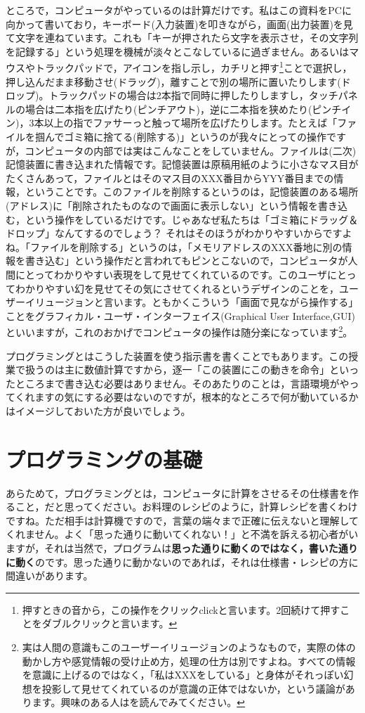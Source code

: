 \documentclass{ltjsbook}
\begin{document}
ところで，コンピュータがやっているのは計算だけです。私はこの資料をPCに向かって書いており，キーボード(入力装置)を叩きながら，画面(出力装置)を見て文字を連ねています。これも「キーが押されたら文字を表示させ，その文字列を記録する」という処理を機械が淡々とこなしているに過ぎません。あるいはマウスやトラックパッドで，アイコンを指し示し，カチリと押す\footnote{押すときの音から，この操作をクリックclickと言います。2回続けて押すことをダブルクリックと言います。}ことで選択し，押し込んだまま移動させ(ドラッグ)，離すことで別の場所に置いたりします(ドロップ)。トラックパッドの場合は2本指で同時に押したりしますし，タッチパネルの場合は二本指を広げたり(ピンチアウト)，逆に二本指を狭めたり(ピンチイン)，3本以上の指でファサーっと触って場所を広げたりします。たとえば「ファイルを掴んでゴミ箱に捨てる(削除する)」というのが我々にとっての操作ですが，コンピュータの内部では実はこんなことをしていません。ファイルは(二次)記憶装置に書き込まれた情報です。記憶装置は原稿用紙のように小さなマス目がたくさんあって，ファイルとはそのマス目のXXX番目からYYY番目までの情報，ということです。このファイルを削除するというのは，記憶装置のある場所(アドレス)に「削除されたものなので画面に表示しない」という情報を書き込む，という操作をしているだけです。じゃあなぜ私たちは「ゴミ箱にドラッグ＆ドロップ」なんてするのでしょう？ それはそのほうがわかりやすいからですよね。「ファイルを削除する」というのは，「メモリアドレスのXXX番地に別の情報を書き込む」という操作だと言われてもピンとこないので，コンピュータが人間にとってわかりやすい表現をして見せてくれているのです。このユーザにとってわかりやすい幻を見せてその気にさせてくれるというデザインのことを，ユーザーイリュージョンと言います。ともかくこういう「画面で見ながら操作する」ことをグラフィカル・ユーザ・インターフェイス(Graphical User Interface,GUI)といいますが，これのおかげでコンピュータの操作は随分楽になっています\footnote{実は人間の意識もこのユーザーイリュージョンのようなもので，実際の体の動かし方や感覚情報の受け止め方，処理の仕方は別ですよね。すべての情報を意識に上げるのではなく，「私はXXXをしている」と身体がそれっぽい幻想を投影して見せてくれているのが意識の正体ではないか，という議論があります。興味のある人は\textcite{UserIlluision2002}を読んでみてください。}。

プログラミングとはこうした装置を使う指示書を書くことでもあります。この授業で扱うのは主に数値計算ですから，逐一「この装置にこの動きを命令」といったところまで書き込む必要はありません。そのあたりのことは，言語環境がやってくれますの気にする必要はないのですが，根本的なところで何が動いているかはイメージしておいた方が良いでしょう。


\section{プログラミングの基礎}
あらためて，プログラミングとは，コンピュータに計算をさせるその仕様書を作ること，だと思ってください。お料理のレシピのように，計算レシピを書くわけですね。ただ相手は計算機ですので，言葉の端々まで正確に伝えないと理解してくれません。よく「思った通りに動いてくれない！」と不満を訴える初心者がいますが，それは当然で，プログラムは\textbf{思った通りに動くのではなく，書いた通りに動く}のです。思った通りに動かないのであれば，それは仕様書・レシピの方に間違いがあります。
\end{document}

